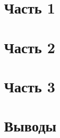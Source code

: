 \documentclass[a4paper]{article}
\begin{document}
\begin{titlepage}
		
\end{titlepage}

\newpage
\pagestyle{fancy} %
\fancyhf{} %
\fancyfoot[R]{\thepage}

\section{Часть 1}


\section{Часть 2}


\section{Часть 3}


\section{Выводы}


\newpage
\end{document}
